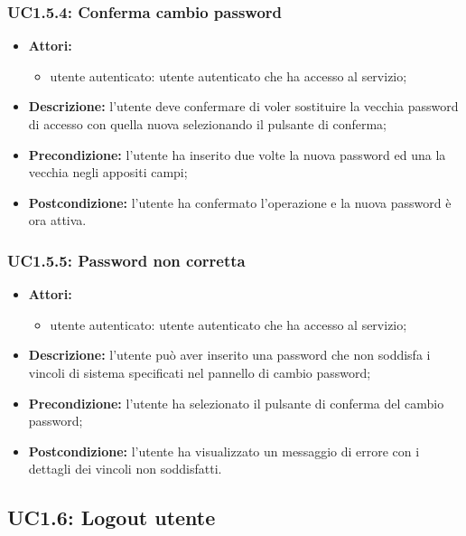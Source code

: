 \subsubsection{UC1.5.4: Conferma cambio password}

\begin{itemize}
	\item \textbf{Attori:}
	\begin{itemize}
		\item utente autenticato: utente autenticato che ha accesso al servizio;
	\end{itemize}
	\item \textbf{Descrizione:} l'utente deve confermare di voler sostituire la vecchia password di accesso con quella nuova selezionando il pulsante di conferma;
	\item \textbf{Precondizione:} l'utente ha inserito due volte la nuova password ed una la vecchia negli appositi campi;
	\item \textbf{Postcondizione:} l'utente ha confermato l'operazione e la nuova password è ora attiva.
\end{itemize}

\subsubsection{UC1.5.5: Password non corretta}

\begin{itemize}
	\item \textbf{Attori:}
	\begin{itemize}
		\item utente autenticato: utente autenticato che ha accesso al servizio;
	\end{itemize}
	\item \textbf{Descrizione:} l'utente può aver inserito una password che non soddisfa i vincoli di sistema specificati nel pannello di cambio password;
	\item \textbf{Precondizione:} l'utente ha selezionato il pulsante di conferma del cambio password;
	\item \textbf{Postcondizione:} l'utente ha visualizzato un messaggio di errore con i dettagli dei vincoli non soddisfatti.
\end{itemize}

\pagebreak


\subsection{UC1.6: Logout utente}

